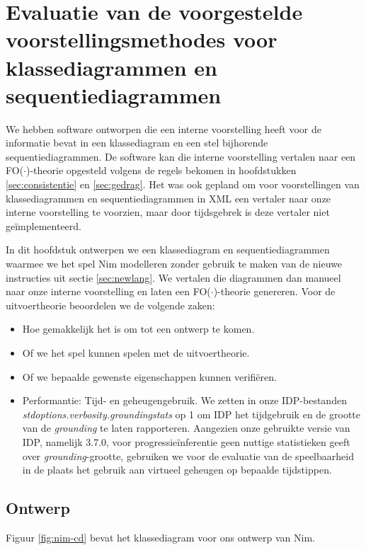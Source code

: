 \chapter{Evaluatie van de voorgestelde voorstellingsmethodes voor klassediagrammen en sequentiediagrammen}\label{sec:evaluatie}
We hebben software ontworpen die een interne voorstelling heeft voor de informatie bevat in een klassediagram en een stel bijhorende sequentiediagrammen. De software kan die interne voorstelling vertalen naar een FO($\cdot$)-theorie opgesteld volgens de regels bekomen in hoofdstukken \ref{sec:consistentie} en \ref{sec:gedrag}. Het was ook gepland om voor voorstellingen van klassediagrammen en sequentiediagrammen in XML een vertaler naar onze interne voorstelling te voorzien, maar door tijdsgebrek is deze vertaler niet ge\"implementeerd.

In dit hoofdstuk ontwerpen we een klassediagram en sequentiediagrammen waarmee we het spel Nim modelleren zonder gebruik te maken van de nieuwe instructies uit sectie \ref{sec:newlang}. We vertalen die diagrammen dan manueel naar onze interne voorstelling en laten een FO($\cdot$)-theorie genereren. Voor de uitvoertheorie beoordelen we de volgende zaken:

\begin{itemize}
	\item Hoe gemakkelijk het is om tot een ontwerp te komen.
	\item Of we het spel kunnen spelen met de uitvoertheorie.
	\item Of we bepaalde gewenste eigenschappen kunnen verifi\"eren.
	\item Performantie: Tijd- en geheugengebruik. We zetten in onze IDP-bestanden \textit{stdoptions.verbosity.groundingstats} op 1 om IDP het tijdgebruik en de grootte van de \textit{grounding}\cite{DeCatBroes2014PLaa} te laten rapporteren. Aangezien onze gebruikte versie van IDP, namelijk 3.7.0, voor progressie\"inferentie geen nuttige statistieken geeft over \textit{grounding}-grootte, gebruiken we voor de evaluatie van de speelbaarheid in de plaats het gebruik aan virtueel geheugen op bepaalde tijdstippen.
\end{itemize}

\section{Ontwerp}

Figuur \ref{fig:nim-cd} bevat het klassediagram voor ons ontwerp van Nim.

